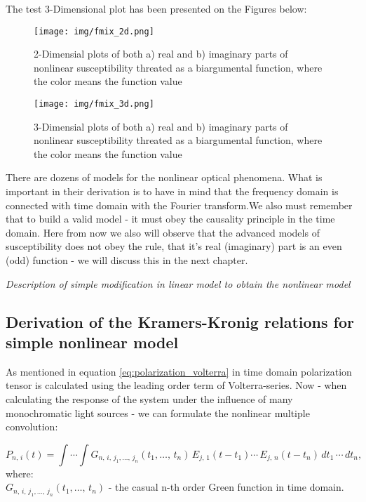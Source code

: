 \documentclass[12pt,twoside,a4paper]{article}
\numberwithin{equation}{subsection}
\numberwithin{figure}{subsection}
\begin{document}
The test 3-Dimensional plot has been presented on the Figures below:

\begin{figure} \label{fig:fmix_2d}
  \texttt{[image: img/fmix\_2d.png]}
  \caption{2-Dimensial plots of both a) real and b) imaginary parts of nonlinear susceptibility threated as a biargumental
  function, where the color means the function value}
\end{figure}

\begin{figure} \label{fig:fmix_3d}
  \texttt{[image: img/fmix\_3d.png]}
  \caption{3-Dimensial plots of both a) real and b) imaginary parts of nonlinear susceptibility threated as a biargumental
  function, where the color means the function value}
\end{figure}

There are dozens of models for the nonlinear optical phenomena. What is important in their derivation is to have in mind that the
frequency domain is connected with time domain with the Fourier transform.We also must remember that to build a valid model - it
must obey the causality principle in the time domain. Here from now we also will observe that the advanced models of susceptibility
does not obey the rule, that it's real (imaginary) part is an even (odd) function - we will discuss this in the next chapter.

\textit{Description of simple modification in linear model to obtain the nonlinear model}

\subsection{Derivation of the Kramers-Kronig relations for simple nonlinear model} \label{chap:problem_dnlo}

As mentioned in equation \ref{eq:polarization_volterra} in time domain polarization tensor is calculated using the leading order
term of Volterra-series. Now - when calculating the response of the system under the influence of many monochromatic light sources
- we can formulate the nonlinear multiple convolution:

\begin{equation} \label{eq:dkk_convolution}
  {P_{n, \,i}}(t)=\int \dotsi \int {G_{n, \,i, \,j_{1},\dotsc, \,j_{n}}}(t_1,\dotsc, \, t_n )\,{E_{j,
  \,1}}(t - {t_{1}})\dotsm\,{E_{j, \,n}}(t -{t_{n}})\,d{t_{1}}\,\dotsm\,d{t_{n}},
\end{equation}
where:\\
${G_{n, \,i, \,j_{1},\dotsc, \, j_{n}}}(t_1, \dotsc, \, t_n)$ - the casual n-th order Green function in
time domain.
\end{document}
